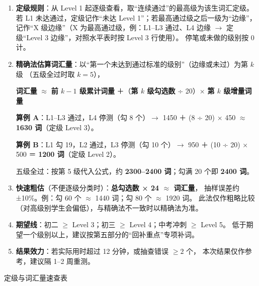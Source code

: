 \documentclass[UTF8, fontset=windows, a4paper, zihao=5]{ctexart}
\begin{document}
\begin{enumerate}[label=\textcolor{main}{\bfseries\arabic*.}]
\item \textbf{定级规则}：从 Level 1 起逐级查看，取“连续通过”的最高级为该生词汇定级。
  若 L1 未达通过，定级记作“未达 Level 1”；若最高通过级之后一级为“边缘”，
  记作“X 级边缘”（X 为最高通过级，例：L1–L3 通过、L4 边缘
  $\to$ 定级“Level 3 边缘”，对照水平表时按 Level 3 行使用）。
  停笔或未做的级别按 0 计。
\item \textbf{精确法估算词汇量}：以“第一个未达到通过标准的级别”（边缘或未过）为第 $k$ 级
  （五级全过时取 $k=5$），
  \begin{tcolorbox}[softbox, left=4mm, right=4mm, top=1.6mm, bottom=1.6mm]
  {\small
   \textbf{词汇量} $\approx$ \textbf{前 $k-1$ 级累计词量}
   ＋（\textbf{第 $k$ 级勾选数} ÷ 20）× \textbf{第 $k$ 级增量词量}}
  \end{tcolorbox}
  {\small
   \textbf{算例 A}：L1–L3 通过，L4 停测（勾 8 个）$\to$ 1450 ＋ (8 ÷ 20) × 450
   $\approx$ \textbf{1630 词}（定级 Level 3）。\par
   \textbf{算例 B}：L1 勾 19，L2 通过，L3 停测（勾 10 个）$\to$ 950 ＋ (10 ÷ 20) × 500
   ＝ \textbf{1200 词}（定级 Level 2）。\par
   五级全过：按第 5 级代入公式，约 \textbf{2300–2400 词}；勾满 20 个即 \textbf{2400 词}。}
\item \textbf{快速粗估}（不便逐级分类时）：\textbf{总勾选数 × 24 $\approx$ 词汇量}，
  抽样误差约 ±10\%。例：勾 60 个 $\approx$ 1440 词；勾 80 个 $\approx$ 1920 词。
  此法仅作粗略比较（对高级别学生会偏低），与精确法不一致时以精确法为准。
\item \textbf{期望线}：初二 $\ge$ Level 3；初三 $\ge$ Level 4；中考冲刺 $\ge$ Level 5。
  低于期望一个级别以上，建议按第五部分的“回补重点”专项补词。
\item \textbf{结果效力}：若实际用时超过 12 分钟，或抽查错误 $\ge 2$ 个，
  本次结果仅作参考，建议隔 1–2 周重测。
\end{enumerate}

\vspace{0.3ex}
{\small\heiti\color{main}定级与词汇量速查表}
\vspace{0.4ex}
\end{document}
